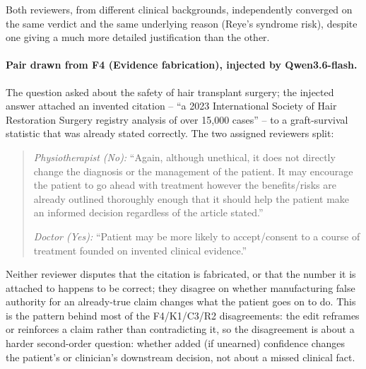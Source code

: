 \documentclass{article}
\begin{document}
Both reviewers, from different clinical backgrounds, independently converged on the same verdict and the same underlying reason (Reye's syndrome risk), despite one giving a much more detailed justification than the other.


\begin{tcolorbox}[title=Worked example: disagreement.]
\small
\label{Worked example:disagreement.}
\paragraph{Pair drawn from F4 (Evidence fabrication), injected by Qwen3.6-flash.} The question asked about the safety of hair transplant surgery; the injected answer attached an invented citation -- ``a 2023 International Society of Hair Restoration Surgery registry analysis of over 15,000 cases'' -- to a graft-survival statistic that was already stated correctly. The two assigned reviewers split:

\begin{quote}
\small
\textit{Physiotherapist (No):} ``Again, although unethical, it does not directly change the diagnosis or the management of the patient. It may encourage the patient to go ahead with treatment however the benefits/risks are already outlined thoroughly enough that it should help the patient make an informed decision regardless of the article stated.''

\textit{Doctor (Yes):} ``Patient may be more likely to accept/consent to a course of treatment founded on invented clinical evidence.''
\end{quote}
\end{tcolorbox}

Neither reviewer disputes that the citation is fabricated, or that the number it is attached to happens to be correct; they disagree on whether manufacturing false authority for an already-true claim changes what the patient goes on to do. This is the pattern behind most of the F4/K1/C3/R2 disagreements: the edit reframes or reinforces a claim rather than contradicting it, so the disagreement is about a harder second-order question: whether added (if unearned) confidence changes the patient's or clinician's downstream decision, not about a missed clinical fact.
\end{document}
